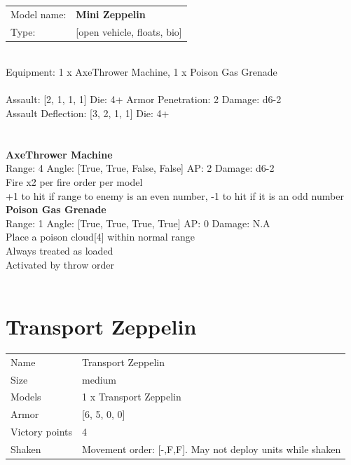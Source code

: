 \begin{tabular}{ll}
Model name: & {\bf Mini Zeppelin } \\
Type: & [open vehicle, floats, bio] \\
\end{tabular}
\ \\
Equipment: 1 x AxeThrower Machine, 1 x Poison Gas Grenade \\
\ \\
Assault: [2, 1, 1, 1] Die: 4+ Armor Penetration: 2 Damage: d6-2 \\
Assault Deflection: [3, 2, 1, 1] Die: 4+\\
\indent  
\ \\

\ \\
{\bf AxeThrower Machine } \\



Range: 4  Angle: [True, True, False, False] AP: 2 Damage: d6-2 \\
Fire x2 per fire order per model\\ 
+1 to hit if range to enemy is an even number, -1 to hit if it is an odd number\\ 




{\bf Poison Gas Grenade } \\



Range: 1  Angle: [True, True, True, True] AP: 0 Damage: N.A \\
Place a poison cloud[4] within normal range\\ 
Always treated as loaded\\ 
Activated by throw order\\ 




 
\ \\














\clearpage

\section{ Transport Zeppelin }

\begin{tabular}{ll}
  Name & Transport Zeppelin \\
  Size & medium\\
  Models & 1 x Transport Zeppelin\\
  Armor & [6, 5, 0, 0]\\
  Victory points & 4\\
  Shaken & Movement order: [-,F,F]. May not deploy units while shaken\\
\end{tabular}

